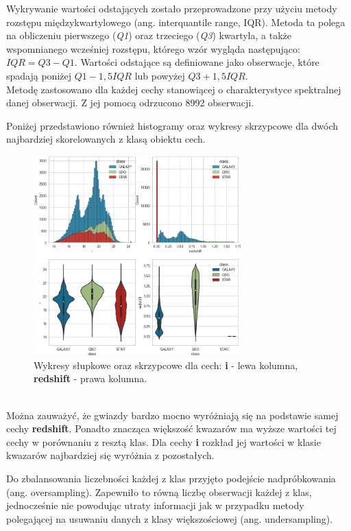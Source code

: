 \documentclass[conference]{IEEEtran}
\begin{document}
Wykrywanie wartości odstających zostało przeprowadzone przy użyciu metody rozstępu międzykwartylowego (ang. interquantile range, IQR). Metoda ta polega na obliczeniu pierwszego (\textit{Q1}) oraz trzeciego (\textit{Q3}) kwartyla, a także wspomnianego wcześniej rozstępu, którego wzór wygląda następująco: $IQR=Q3-Q1$. Wartości odstające są definiowane jako obserwacje, które spadają poniżej $Q1 - 1,5 IQR$ lub powyżej $Q3 + 1,5 IQR$. \\ 
Metodę zastosowano dla każdej cechy stanowiącej o charakterystyce spektralnej danej obserwacji. Z jej pomocą odrzucono 8992 obserwacji. 

Poniżej przedstawiono również histogramy oraz wykresy skrzypcowe dla dwóch najbardziej skorelowanych z klasą obiektu cech. 
\begin{figure}[ht]
        \centering
        \includegraphics[width = 8cm]{figures/plots.png}
        \caption{Wykresy słupkowe oraz skrzypcowe dla cech: \textbf{i} - lewa kolumna, \textbf{redshift} - prawa kolumna.}
\end{figure} \\
Można zauważyć, że gwiazdy bardzo mocno wyróżniają się na podstawie samej cechy \textbf{redshift}. Ponadto znacząca większość kwazarów ma wyższe wartości tej cechy w porównaniu z resztą klas. Dla cechy \textbf{i} rozkład jej wartości w klasie kwazarów najbardziej się wyróżnia z pozostałych.

Do zbalansowania liczebności każdej z klas przyjęto podejście nadpróbkowania (ang. oversampling). Zapewniło to równą liczbę obserwacji każdej z klas, jednocześnie nie powodując utraty informacji jak w przypadku metody polegającej na usuwaniu danych z klasy większościowej (ang. undersampling).
\end{document}
